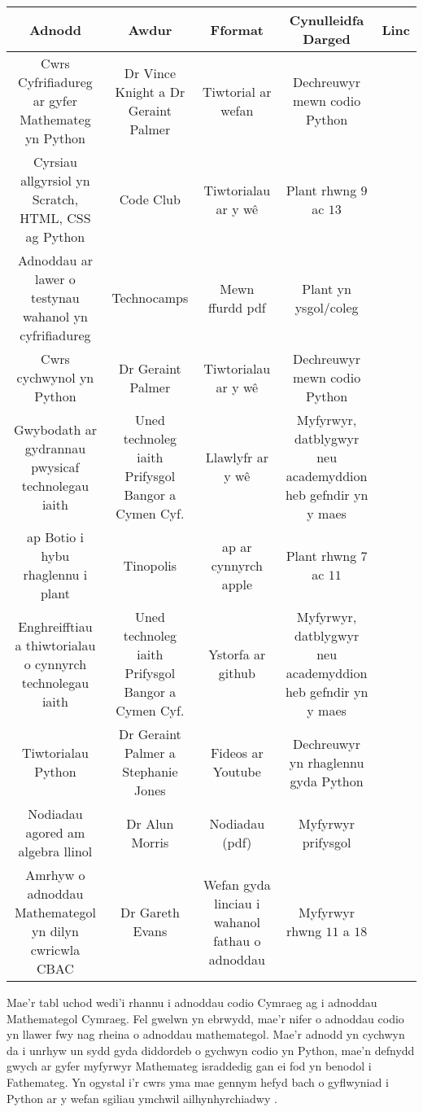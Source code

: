 \begin{center}
\begin{tabular}{ | c | c | c | c | c | }
\hline
Adnodd & Awdur & Fformat & Cynulleidfa Darged & Linc\\
\hline
Cwrs Cyfrifiadureg ar gyfer Mathemateg yn Python & Dr Vince Knight a Dr Geraint Palmer & Tiwtorial ar wefan & Dechreuwyr mewn codio Python & \cite{Cyfrifiadureg-maths}\\
\hline
Cyrsiau allgyrsiol yn Scratch, HTML, CSS ag Python & Code Club & Tiwtorialau ar y w\^{e} & Plant rhwng $9$ ac $13$ & \cite{codeclub} \\
\hline
Adnoddau ar lawer o testynau wahanol yn cyfrifiadureg & Technocamps & Mewn ffurdd pdf & Plant yn ysgol/coleg & \cite{technocamps} \\
\hline
Cwrs cychwynol yn Python & Dr Geraint Palmer & Tiwtorialau ar y w\^{e} & Dechreuwyr mewn codio Python & \cite{python-sgiliauymchwil} \\
\hline
Gwybodath ar gydrannau pwysicaf technolegau iaith & Uned technoleg iaith Prifysgol Bangor a Cymen Cyf. & Llawlyfr ar y w\^{e}  & Myfyrwyr, datblygwyr neu academyddion heb gefndir yn y maes & \cite{technolegau-iaith} \\
\hline
ap Botio i hybu rhaglennu i plant & Tinopolis & ap ar cynnyrch apple & Plant rhwng $7$ ac $11$ & \cite{botio} \\
\hline
Enghreifftiau a thiwtorialau o cynnyrch technolegau iaith  &  Uned technoleg iaith Prifysgol Bangor a Cymen Cyf. & Ystorfa ar github & Myfyrwyr, datblygwyr neu academyddion heb gefndir yn y maes & \cite{github-technolegauiaith} \\
\hline
Tiwtorialau Python & Dr Geraint Palmer a Stephanie Jones & Fideos ar Youtube & Dechreuwyr yn rhaglennu gyda Python & \cite{youtube} \\
\hline
\hline
Nodiadau agored am algebra llinol & Dr Alun Morris & Nodiadau (pdf) & Myfyrwyr prifysgol & \cite{Algebra-llinol}\\
\hline
Amrhyw o adnoddau Mathemategol yn dilyn cwricwla CBAC & Dr Gareth Evans & Wefan gyda linciau i wahanol fathau o adnoddau & Myfyrwyr rhwng $11$ a $18$ & \cite{mathemateg} \\
\hline
\end{tabular}
\end{center}

Mae'r tabl uchod wedi'i rhannu i adnoddau codio Cymraeg ag i adnoddau Mathemategol Cymraeg. Fel gwelwn yn ebrwydd, mae'r nifer o adnoddau codio yn llawer fwy nag rheina o adnoddau mathemategol. Mae'r adnodd \cite{Cyfrifiadureg-maths} yn cychwyn da i unrhyw un sydd gyda diddordeb o gychwyn codio yn Python, mae'n defnydd gwych ar gyfer myfyrwyr Mathemateg israddedig gan ei fod yn benodol i Fathemateg. Yn ogystal i'r cwrs yma mae gennym hefyd bach o gyflwyniad i Python ar y wefan sgiliau ymchwil ailhynhyrchiadwy \cite{python-sgiliauymchwil}. 

